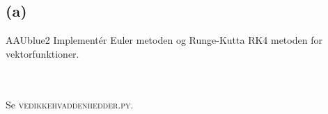 \subsection*{(a) }
%
%
\begin{color}{AAUblue2}
%
Implementér Euler metoden og Runge-Kutta RK4 metoden for vektorfunktioner. 
% 
\end{color}
\\\\
% 
Se \textsc{vedikkehvaddenhedder.py}.
%